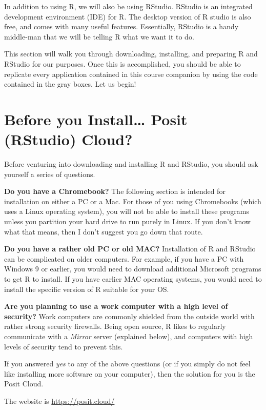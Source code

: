 \documentclass[
]{book}
\begin{document}
In addition to using R, we will also be using RStudio. RStudio is an integrated development environment (IDE) for R. The desktop version of R studio is also free, and comes with many useful features. Essentially, RStudio is a handy middle-man that we will be telling R what we want it to do.

This section will walk you through downloading, installing, and preparing R and RStudio for our purposes. Once this is accomplished, you should be able to replicate every application contained in this course companion by using the code contained in the gray boxes. Let us begin!

\section{Before you Install\ldots{} Posit (RStudio) Cloud?}\label{before-you-install-posit-rstudio-cloud}

Before venturing into downloading and installing R and RStudio, you should ask yourself a series of questions.

\textbf{Do you have a Chromebook?}
The following section is intended for installation on either a PC or a Mac. For those of you using Chromebooks (which uses a Linux operating system), you will not be able to install these programs unless you partition your hard drive to run purely in Linux. If you don't know what that means, then I don't suggest you go down that route.

\textbf{Do you have a rather old PC or old MAC?}
Installation of R and RStudio can be complicated on older computers. For example, if you have a PC with Windows 9 or earlier, you would need to download additional Microsoft programs to get R to install. If you have earlier MAC operating systems, you would need to install the specific version of R suitable for your OS.

\textbf{Are you planning to use a work computer with a high level of security?}
Work computers are commonly shielded from the outside world with rather strong security firewalls. Being open source, R likes to regularly communicate with a \emph{Mirror} server (explained below), and computers with high levels of security tend to prevent this.

If you answered \emph{yes} to any of the above questions (or if you simply do not feel like installing more software on your computer), then the solution for you is the Posit Cloud.

The website is \url{https://posit.cloud/}
\end{document}
